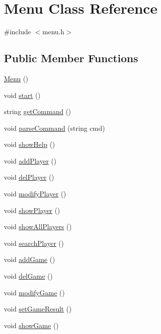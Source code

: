 \hypertarget{class_menu}{\section{Menu Class Reference}
\label{class_menu}
}


{\ttfamily \#include $<$menu.\-h$>$}

\subsection*{Public Member Functions}
\begin{DoxyCompactItemize}
\item 
\hyperlink{class_menu_ad466dd83355124a6ed958430450bfe94}{Menu} ()
\item 
void \hyperlink{class_menu_ae1ec62e738dda7faaaec850bd0b58ffe}{start} ()
\item 
string \hyperlink{class_menu_ab219d3a7dc94afa5e7e1b914a718a60d}{get\-Command} ()
\item 
void \hyperlink{class_menu_a833d41a72b96f4eb4673c573078ea5a2}{parse\-Command} (string cmd)
\item 
void \hyperlink{class_menu_a640371f3713c4af92c4c84894a797720}{show\-Help} ()
\item 
void \hyperlink{class_menu_a02ffb64101a80d13616fbe306c005d73}{add\-Player} ()
\item 
void \hyperlink{class_menu_a075f9557bb1a6f5c88008da898aef380}{del\-Player} ()
\item 
void \hyperlink{class_menu_abde1a527a400f992ddcfcb2458f22447}{modify\-Player} ()
\item 
void \hyperlink{class_menu_a726a0749edb5bc20dbf017f7059a9fe4}{show\-Player} ()
\item 
void \hyperlink{class_menu_a9dd2f29a484d18d73979e4c138b85f50}{show\-All\-Players} ()
\item 
void \hyperlink{class_menu_a03a1516dd60de0b50cd7559f80ddef85}{search\-Player} ()
\item 
void \hyperlink{class_menu_aa364242b613a8abe195cf551586a509a}{add\-Game} ()
\item 
void \hyperlink{class_menu_a352d42071396d84dd91112e500e28f48}{del\-Game} ()
\item 
void \hyperlink{class_menu_adb91c65527e7bf3dccd9c5ce76a2bfcc}{modify\-Game} ()
\item 
void \hyperlink{class_menu_a057158d6a62ae559e702a1aebab49e6a}{set\-Game\-Result} ()
\item 
void \hyperlink{class_menu_a8903b069ab923805203351e4463992a8}{show\-Game} ()

\end{DoxyCompactItemize}
